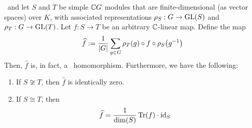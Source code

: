 \begin{boxtheorem} \label{SP:Thm:Schur_fin_G_over_C}
    \ and let $S$ and $T$ be simple $\mathbb{C} G$ modules that are finite-dimensional (as vector spaces) over $K$, with associated representations $\rho_S : G \to \operatorname{GL}\!\left( S \right)$ and $\rho_T : G \to \operatorname{GL}\!\left( T \right)$. Let $f : S \to T$ be an arbitrary $\mathbb{C}$-linear map. Define the map
    \begin{align}
        \widehat{f} := \frac{1}{\left\lvert G \right\rvert} \sum_{g \in G} \rho_T(g) \circ f \circ \rho_S\!\left( g^{-1} \right)
        \label{SP:eq:Def_Hat_Map}
    \end{align}
    Then, $\hat{f}$ is, in fact, a \CGM\ homomorphism. Furthermore, we have the following:
    \begin{enumerate}[label = \normalfont \arabic*.]
        \item If $S \not\cong T$, then $\hat{f}$ is identically zero.
        \item If $S \cong T$, then
        \begin{align*}
            \widehat{f} &= \frac{1}{\dim\!\left( S \right)} \operatorname{Tr}\!\left( f \right) \cdot \operatorname{id}_S
        \end{align*}
    \end{enumerate}
\end{boxtheorem}
